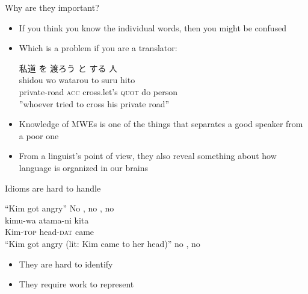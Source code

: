 \begin{frame}{Why are they important?}

\begin{itemize}
\item If you think you know the individual words, then you might be  confused

\item  Which is a problem if you are a translator:
\\  
\begin{exe}
  \ex \glll 私道 を 渡ろう と する 人 \\
  shidou wo watarou to suru hito \\
  private-road \textsc{acc} cross.let's \textsc{quot} do person \\
\trans ''whoever tried to cross his private road''
\end{exe}
\item Knowledge of MWEs is one of the things that separates a good speaker from a poor one
\item From a linguist's point of view, they also reveal something about
  how language is organized in our brains
\end{itemize}




\end{frame}

\begin{frame}{Idioms are hard to handle}
\begin{exe}
  \ex {}
  \trans ``Kim got angry''
  \trans No , no , no 
  \ex  \glll {}    \\
  kimu-wa atama-ni  kita \\
  Kim-\textsc{top} head-\textsc{dat} came \\
  \trans ``Kim got angry (lit: Kim came to her head)''
  \trans no , no 
\end{exe}

\begin{itemize}
\item They are hard to identify
\item They require work to represent
\end{itemize}

\end{frame}

